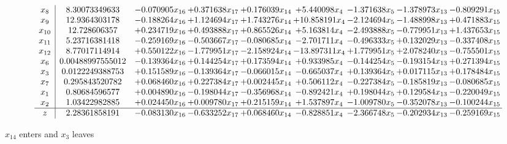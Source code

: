 \documentclass[10pt]{article}
\begin{document}
 \[\begin{array}{c| c c@{\hskip 2pt} c@{\hskip 2pt} c@{\hskip 2pt} c@{\hskip 2pt} c@{\hskip 2pt} c@{\hskip 2pt} c@{\hskip 2pt} }
 x_{8}   &  8.30073349633 & -0.070905 x_{16} & + 0.371638 x_{17} & + 0.176039 x_{14} & + 5.440098 x_{4} & -1.371638 x_{5} & -1.378973 x_{13} & -0.809291 x_{15}\\
 x_{9}   &  12.9364303178 & -0.188264 x_{16} & + 1.124694 x_{17} & + 1.743276 x_{14} & + 10.858191 x_{4} & -2.124694 x_{5} & -1.488998 x_{13} & + 0.471883 x_{15}\\
 x_{10}   &  12.728606357 & + 0.234719 x_{16} & + 0.493888 x_{17} & + 0.865526 x_{14} & + 5.163814 x_{4} & -2.493888 x_{5} & -0.779951 x_{13} & + 1.437653 x_{15}\\
 x_{11}   &  5.23716381418 & -0.259169 x_{16} & -0.503667 x_{17} & -0.080685 x_{14} & -2.701711 x_{4} & -0.496333 x_{5} & + 0.132029 x_{13} & -0.337408 x_{15}\\
 x_{12}   &  8.77017114914 & + 0.550122 x_{16} & -1.779951 x_{17} & -2.158924 x_{14} & -13.897311 x_{4} & + 1.779951 x_{5} & + 2.078240 x_{13} & -0.755501 x_{15}\\
 x_{6}   &  0.00488997555012 & -0.139364 x_{16} & + 0.144254 x_{17} & + 0.173594 x_{14} & + 0.933985 x_{4} & -0.144254 x_{5} & -0.193154 x_{13} & + 0.271394 x_{15}\\
 x_{3}   &  0.0122249388753 & + 0.151589 x_{16} & -0.139364 x_{17} & -0.066015 x_{14} & -0.665037 x_{4} & + 0.139364 x_{5} & + 0.017115 x_{13} & + 0.178484 x_{15}\\
 x_{7}   &  0.295843520782 & + 0.068460 x_{16} & + 0.227384 x_{17} & + 0.002445 x_{14} & + 0.506112 x_{4} & -0.227384 x_{5} & -0.185819 x_{13} & -0.080685 x_{15}\\
 x_{1}   &  0.80684596577 & + 0.004890 x_{16} & -0.198044 x_{17} & -0.356968 x_{14} & -0.892421 x_{4} & + 0.198044 x_{5} & + 0.129584 x_{13} & -0.220049 x_{15}\\
 x_{2}   &  1.03422982885 & + 0.024450 x_{16} & + 0.009780 x_{17} & + 0.215159 x_{14} & + 1.537897 x_{4} & -1.009780 x_{5} & -0.352078 x_{13} & -0.100244 x_{15}\\
\hline
z    &  2.28361858191 & -0.083130 x_{16} & -0.633252 x_{17} & + 0.068460 x_{14} & -0.828851 x_{4} & -2.366748 x_{5} & -0.202934 x_{13} & -0.259169 x_{15}\\
\end{array}\]


 $ x_{14} $ enters and $ x_{3} $ leaves 
\end{document}
